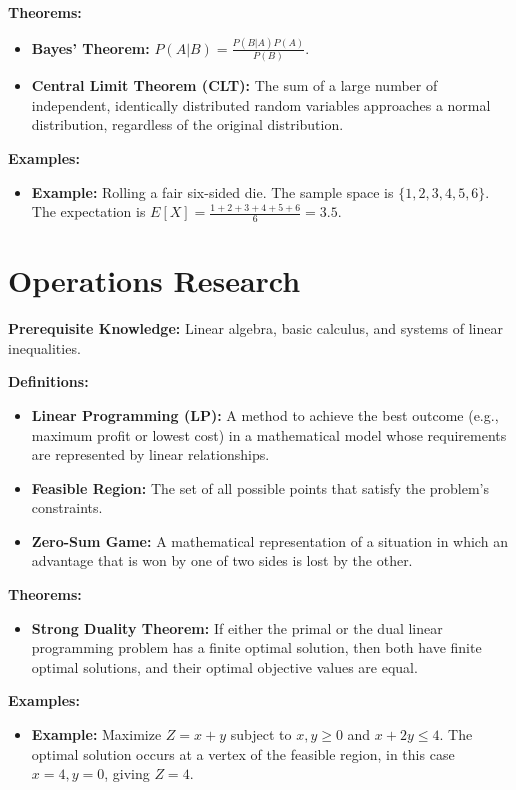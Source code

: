 \textbf{Theorems:}
\begin{itemize}
    \item \textbf{Bayes' Theorem:} $P(A|B) = \frac{P(B|A)P(A)}{P(B)}$.
    \item \textbf{Central Limit Theorem (CLT):} The sum of a large number of independent, identically distributed random variables approaches a normal distribution, regardless of the original distribution.
\end{itemize}

\textbf{Examples:}
\begin{itemize}
    \item \textbf{Example:} Rolling a fair six-sided die. The sample space is $\{1,2,3,4,5,6\}$. The expectation is $E[X] = \frac{1+2+3+4+5+6}{6} = 3.5$.
\end{itemize}


\section{Operations Research}
\textbf{Prerequisite Knowledge:} Linear algebra, basic calculus, and systems of linear inequalities.

\textbf{Definitions:}
\begin{itemize}
    \item \textbf{Linear Programming (LP):} A method to achieve the best outcome (e.g., maximum profit or lowest cost) in a mathematical model whose requirements are represented by linear relationships.
    \item \textbf{Feasible Region:} The set of all possible points that satisfy the problem's constraints.
    \item \textbf{Zero-Sum Game:} A mathematical representation of a situation in which an advantage that is won by one of two sides is lost by the other.
\end{itemize}

\textbf{Theorems:}
\begin{itemize}
    \item \textbf{Strong Duality Theorem:} If either the primal or the dual linear programming problem has a finite optimal solution, then both have finite optimal solutions, and their optimal objective values are equal.
\end{itemize}

\textbf{Examples:}
\begin{itemize}
    \item \textbf{Example:} Maximize $Z = x + y$ subject to $x, y \geq 0$ and $x + 2y \leq 4$. The optimal solution occurs at a vertex of the feasible region, in this case $x=4, y=0$, giving $Z=4$.
\end{itemize}


